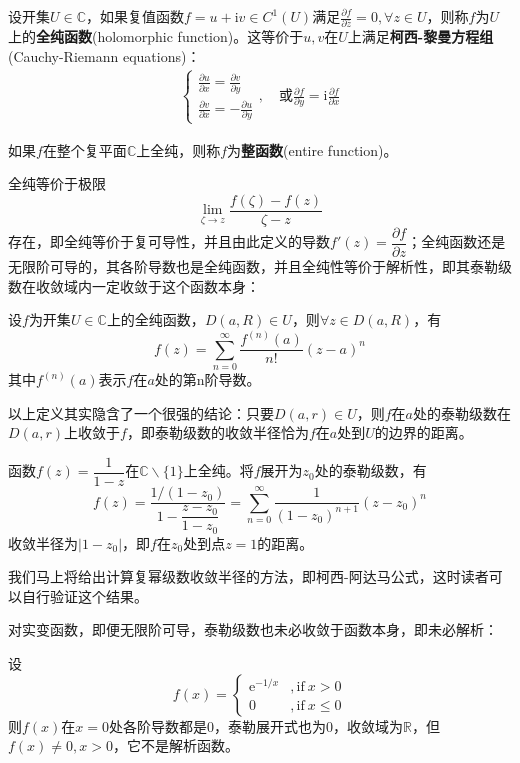 \begin{definition}[全纯函数]
    设开集$U\in\mathbb{C}$，如果复值函数$f=u+\mathrm{i}v\in C^1(U)$满足$\frac{\partial f}{\partial \overline{z}}=0,\forall z\in U$，则称$f$为$U$上的\textbf{全纯函数}(holomorphic function)。这等价于$u,v$在$U$上满足\textbf{柯西-黎曼方程组}(Cauchy-Riemann equations)：
    \begin{align*}
        \begin{cases}
        \displaystyle\frac{\partial u}{\partial x}=\frac{\partial v}{\partial y}\\
        \displaystyle\frac{\partial v}{\partial x}=-\frac{\partial u}{\partial y}
        \end{cases},\quad \text{或}\frac{\partial f}{\partial y}= \mathrm{i}\frac{\partial f}{\partial x}
    \end{align*}
\end{definition}
\begin{definition}[整函数]
    如果$f$在整个复平面$\mathbb{C}$上全纯，则称$f$为\textbf{整函数}(entire function)。
\end{definition}

全纯等价于极限\[\lim_{\zeta\to z}\frac{f(\zeta)-f(z)}{\zeta-z}\]
存在，即全纯等价于复可导性，并且由此定义的导数$f'(z)=\dfrac{\partial f}{\partial z}$；全纯函数还是无限阶可导的，其各阶导数也是全纯函数，并且全纯性等价于解析性，即其泰勒级数在收敛域内一定收敛于这个函数本身：
\begin{definition}[复变函数的泰勒级数展开]
    设$f$为开集$U\in\mathbb{C}$上的全纯函数，$D(a,R)\in U$，则$\forall z\in D(a,R)$，有
    \[f(z)=\sum_{n=0}^{\infty}\frac{f^{(n)}(a)}{n!}(z-a)^n\]
    其中$f^{(n)}(a)$表示$f$在$a$处的第n阶导数。
\end{definition}

以上定义其实隐含了一个很强的结论：只要$D(a,r)\in U$，则$f$在$a$处的泰勒级数在$D(a,r)$上收敛于$f$，即泰勒级数的收敛半径恰为$f$在$a$处到$U$的边界的距离。
\begin{example}
    函数$f(z)=\dfrac{1}{1-z}$在$\mathbb{C}\backslash\{1\}$上全纯。将$f$展开为$z_0$处的泰勒级数，有
    \[f(z)=\frac{1/(1-z_0)}{1-\dfrac{z-z_0}{1-z_0}}=\sum_{n=0}^{\infty}\frac{1}{(1-z_0)^{n+1}}(z-z_0)^n\]
    收敛半径为$|1-z_0|$，即$f$在$z_0$处到点$z=1$的距离。

    我们马上将给出计算复幂级数收敛半径的方法，即柯西-阿达马公式，这时读者可以自行验证这个结果。
\end{example}

对实变函数，即便无限阶可导，泰勒级数也未必收敛于函数本身，即未必解析：
\begin{example}
    设$$f(x)=\begin{cases}
    \mathrm{e}^{-1/x}&\mathrm{,if\ }x> 0\\
    0&\mathrm{,if\ }x\leq 0
    \end{cases}$$
    则$f(x)$在$x=0$处各阶导数都是0，泰勒展开式也为0，收敛域为$\mathbb{R}$，但$f(x)\neq 0,x>0$，它不是解析函数。
\end{example}

